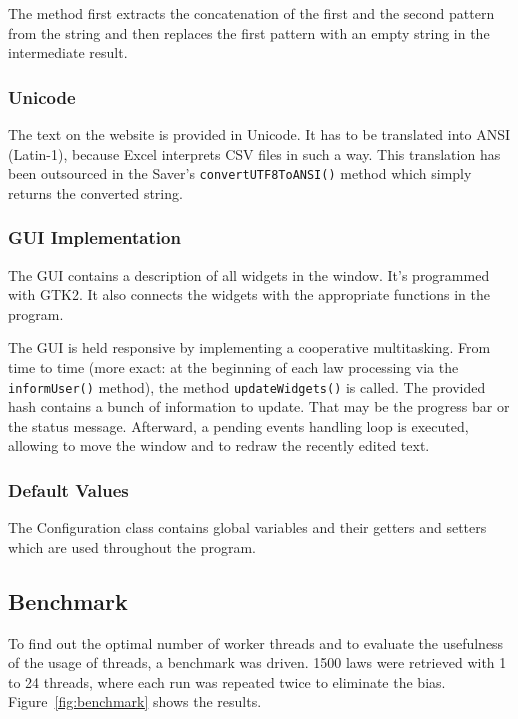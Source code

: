 \documentclass{scrartcl}
\begin{document}
The method first extracts the concatenation of the first and the second pattern from the string and then replaces the first pattern with an empty string in the intermediate result. 

\subsubsection{Unicode}
The text on the website is provided in Unicode. It has to be translated into ANSI (Latin-1), because Excel interprets CSV files in such a way. This translation has been outsourced in the Saver's \texttt{convertUTF8ToANSI()} method which simply returns the converted string.

\subsubsection{GUI Implementation}
The GUI contains a description of all widgets in the window. It's programmed with GTK2. It also connects the widgets with the appropriate functions in the program.

The GUI is held responsive by implementing a cooperative multitasking. From time to time (more exact: at the beginning of each law processing via the \texttt{informUser()} method), the method \texttt{updateWidgets()} is called. The provided hash contains a bunch of information to update. That may be the progress bar or the status message. Afterward, a pending events handling loop is executed, allowing to move the window and to redraw the recently edited text.

\subsubsection{Default Values}
The Configuration class contains global variables and their getters and setters which are used throughout the program.

\subsection{Benchmark}
To find out the optimal number of worker threads and to evaluate the usefulness of the usage of threads, a benchmark was driven. 1500 laws were retrieved with 1 to 24 threads, where each run was repeated twice to eliminate the bias. Figure~\ref{fig:benchmark} shows the results.
\end{document}
